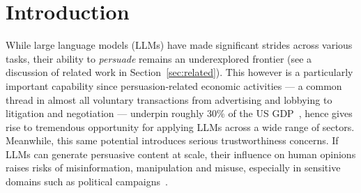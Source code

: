 \section{Introduction}

While large language models (LLMs) have made significant strides across various tasks, their ability to \emph{persuade} remains an underexplored frontier (see a discussion of related work in Section~\ref{sec:related}). 
This however is a particularly important capability since  persuasion-related economic activities --- a common thread in almost all voluntary transactions from advertising and lobbying to litigation and negotiation --- underpin roughly 30\% of the US GDP~\citep{antioch2013persuasion, mccloskey1995one}, hence gives rise to tremendous opportunity for applying LLMs   
 across a wide range of sectors. Meanwhile, this same potential introduces serious trustworthiness concerns. If LLMs can generate persuasive content at scale, their influence on human opinions raises risks of misinformation, manipulation and misuse, especially in sensitive domains such as political campaigns~\citep{voelkel2023artificial, goldstein2024persuasive}.

